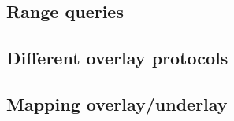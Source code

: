 \subsection{Range queries}
\subsection{Different overlay protocols}
\subsection{Mapping overlay/underlay}

